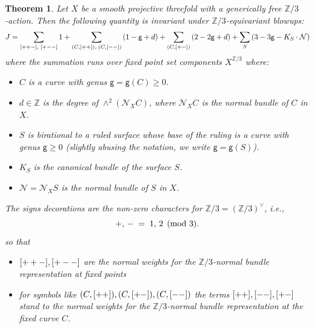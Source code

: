 \documentclass[10pt,a4paper]{amsart}
\newtheorem{theorem}{Theorem}
\newcommand{\lm}{\textup{\texttt{-}}}
\newcommand{\lp}{\textup{\texttt{+}}}
\begin{document}
\begin{theorem}\label{thm:pure-geometry}
Let $X$ be a smooth projective threefold with a generically free $\mathbb Z/3$‐action.  Then the following quantity is invariant under \(\mathbb{Z}/3\)-equivariant blowups:
\begin{equation}
  J = 
    \sum_{[\lp\lp\lm],\; [\lp\lm\lm]} 1
    + 
    \sum_{(C,[\lp\lp]),\; (C,[\lm\lm])} \left(1 - \mathsf{g} + d\right)
    +
    \sum_{(C,[\lp\lm])} \left(2 - 2\mathsf{g} + d\right)
    +
    \sum_{S} \left(3 - 3\mathsf{g} - K_S\cdot \mathcal N\right)
\end{equation}
where the summation runs over fixed point set components $X^{\mathbb Z/3}$ where:
\begin{itemize}
  \item 
   $C$ is a curve with genus \(\mathsf{g}=\mathsf{g}(C) \geq 0\).
  \item 
    \(d \in \mathbb{Z}\) is the degree of \(\wedge^{2}(\mathcal{N}_XC)\), where \(\mathcal{N}_XC\) is the normal bundle of $C$ in $X$.
  \item $S$ is birational to a ruled surface whose base of the ruling is a curve with genus 
    \(\mathsf{g} \geq 0\) (slightly abusing the notation, we write $\mathsf g=\mathsf g(S)$).
  \item 
    \(K_{S}\) is the canonical bundle of the surface \(S\).
  \item 
    \(\mathcal{N}=\mathcal N_X S\) is the normal bundle of \(S\) in $X$.
\end{itemize}
The signs decorations are the non-zero characters for \(\mathbb Z/3 = (\mathbb Z/3)^{\vee}\), i.e.,
\[
  \lp,\,\lm \;=\; 1,\,2 \pmod{3}.
\]
so that
\begin{itemize}
    \item $[\lp\lp\lm], [\lp\lm\lm]$ are the normal weights for the $\mathbb Z/3$-normal bundle representation at fixed points
    \item for symbols like $(C,[\lp\lp]), (C,[\lp\lm]), (C,[\lm\lm])$ the terms $[\lp\lp], [\lm\lm], [\lp\lm]$ stand to the normal weights for the $\mathbb Z/3$-normal bundle representation at the fixed curve $C$.
\end{itemize}
 \end{theorem}
\end{document}
